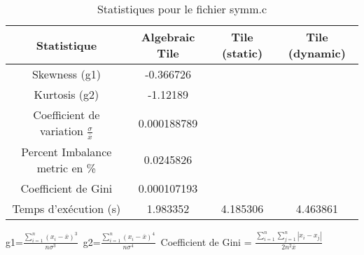 \documentclass{article}
\begin{document}
\begin{table}[htbp]
  \centering
  \caption{Statistiques pour le fichier symm.c}
  \begin{tabular}{|c|c|c|c|}
    \hline
    Statistique & Algebraic Tile & Tile (static) & Tile (dynamic) \\ 
    \hline
    Skewness (g1)  & -0.366726 &  &  \\ 
    Kurtosis (g2)  & -1.12189 &  &  \\ 
    Coefficient de variation $ \frac{\sigma}{\overline{x}} $ & 0.000188789 &  & \\ 
    Percent Imbalance metric en \% & 0.0245826 &  & \\ 
    Coefficient de Gini  & 0.000107193 &  & \\ 
    Temps d'exécution (s) &  1.983352    &  4.185306   &  4.463861   \\ 

    \hline
  \end{tabular}
\end{table}\newline
g1=$ \frac{\sum_{i=1}^{n} (x_i - \overline{x})^3}{n\sigma^3} $\
g2=$ \frac{\sum_{i=1}^{n} (x_i - \overline{x})^4}{n\sigma^4} $\
Coefficient de Gini = $ \frac{\sum_{i=1}^{n}\sum_{j=1}^{n} |x_i - x_j|}{2n^2\overline{x}} $\
\newpage
\end{document}

